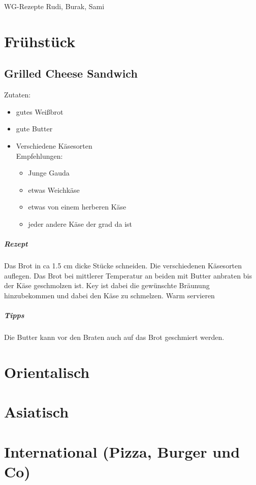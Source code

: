 \documentclass[11pt,twoside,a4paper]{book}
\begin{document}
\center\Huge{WG-Rezepte}
\center\large Rudi, Burak, Sami
\newpage

\tableofcontents

\setcounter{page}{0}
\chapter{Frühstück}
\section{Grilled Cheese Sandwich}
Zutaten:
	\begin{itemize}
		\item gutes Weißbrot
		\item gute Butter
		\item Verschiedene Käsesorten\\
		Empfehlungen:
		\begin{itemize}
			\item Junge Gauda
			\item etwas Weichkäse
			\item etwas von einem herberen Käse
			\item jeder andere Käse der grad da ist
		\end {itemize}
	\end{itemize}
\paragraph{Rezept}
Das Brot in ca 1.5 cm dicke Stücke schneiden.
Die verschiedenen Käsesorten auflegen.
Das Brot bei mittlerer Temperatur an beiden mit Butter anbraten bis der Käse geschmolzen ist.
Key ist dabei die gewünschte Bräunung hinzubekommen und dabei den Käse zu schmelzen.
Warm servieren
\paragraph{Tipps}
Die Butter kann vor den Braten auch auf das Brot geschmiert werden.
\chapter{Orientalisch}

\chapter{Asiatisch}

\chapter{International (Pizza, Burger und Co)}
\end{document}
